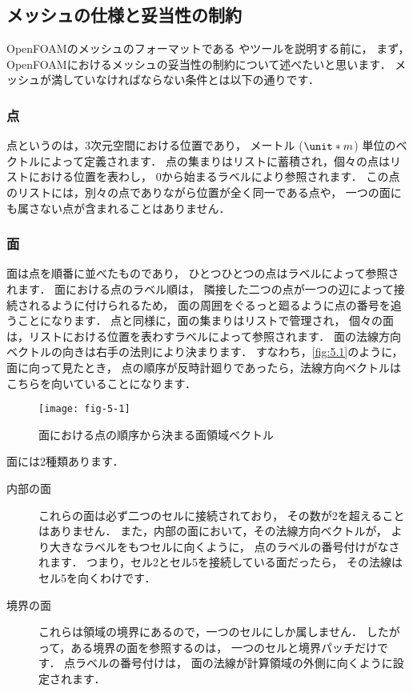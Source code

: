 \subsection{メッシュの仕様と妥当性の制約}
\label{ssec:5.1.1}
%
%
OpenFOAMのメッシュのフォーマットである
やツールを説明する前に，
まず，OpenFOAMにおけるメッシュの妥当性の制約について述べたいと思います．
メッシュが満していなければならない条件とは以下の通りです．

\subsubsection{点}
\label{sssec:5.1.1.1}
点というのは，3次元空間における位置であり，
メートル ($\unit*{m}$) 単位のベクトルによって定義されます．
点の集まりはリストに蓄積され，個々の点はリストにおける位置を表わし，
0から始まるラベルにより参照されます．
この点のリストには，別々の点でありながら位置が全く同一である点や，
一つの面にも属さない点が含まれることはありません．

\subsubsection{面}
\label{sssec:5.1.1.2}
面は点を順番に並べたものであり，
ひとつひとつの点はラベルによって参照されます．
面における点のラベル順は，
隣接した二つの点が一つの辺によって接続されるように付けられるため，
面の周囲をぐるっと廻るように点の番号を追うことになります．
点と同様に，面の集まりはリストで管理され，
個々の面は，リストにおける位置を表わすラベルによって参照されます．
面の法線方向ベクトルの向きは右手の法則により決まります．
すなわち，\autoref{fig:5.1}のように，面に向って見たとき，
点の順序が反時計廻りであったら，法線方向ベクトルはこちらを向いていることになります．


\begin{figure}[ht]
 \texttt{[image: fig-5-1]}
 \caption{面における点の順序から決まる面領域ベクトル}
 \label{fig:5.1}
\end{figure}


面には2種類あります．
\begin{description}
 \item[内部の面]
            これらの面は必ず二つのセルに接続されており，
            その数が2を超えることはありません．
            また，内部の面において，その法線方向ベクトルが，
            より大きなラベルをもつセルに向くように，
            点のラベルの番号付けがなされます．
            つまり，セル2とセル5を接続している面だったら，
            その法線はセル5を向くわけです．
 \item[境界の面]
            これらは領域の境界にあるので，一つのセルにしか属しません．
            したがって，ある境界の面を参照するのは，
            一つのセルと境界パッチだけです．
            点ラベルの番号付けは，
            面の法線が計算領域の外側に向くように設定されます．
\end{description}

